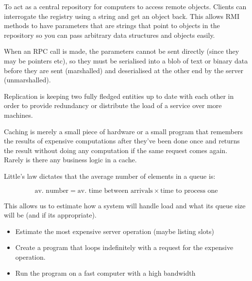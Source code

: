
To act as a central repository for computers to access remote objects. Clients
can interrogate the registry using a string and get an object back. This allows
RMI methods to have parameters that are strings that point to objects in the
repository so you can pass arbitrary data structures and objects easily.


When an RPC call is made, the parameters cannot be sent directly (since they may
be pointers etc), so they must be serialised into a blob of text or binary data
before they are sent (marshalled) and deserialised at the other end by the
server (unmarshalled).


Replication is keeping two fully fledged entities up to date with each other in
order to provide redundancy or distribute the load of a service over more
machines.

Caching is merely a small piece of hardware or a small program that remembers
the results of expensive computations after they've been done once and returns
the result without doing any computation if the same request comes again. Rarely
is there any business logic in a cache.


Little's law dictates that the average number of elements in a queue is:

\[
  \text{av. number} = \text{av. time between arrivals} \times \text{time to process one}
\]

This allows us to estimate how a system will handle load and what its queue size
will be (and if its appropriate).


\begin{itemize}
  \item Estimate the most expensive server operation (maybe listing slots)
  \item Create a program that loops indefinitely with a request for the
    expensive operation.
  \item Run the program on a fast computer with a high bandwidth
\end{itemize}

